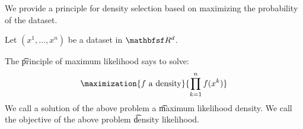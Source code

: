

We provide a principle for density selection based on maximizing the probability of the dataset.


Let $(x^1, \dots, x^n)$ be a dataset in $\R^d$.

The \t{principle of maximum likelihood} says to solve:
\[
  \maximization{f \text{ a density}}{\product_{k = 1}^{n} f(x^k)}
\]
We call a solution of the above problem a \t{maximum likelihood density}.
We call the objective of the above problem \t{density likelihood}.

\blankpage
